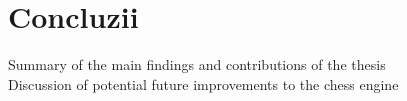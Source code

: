 \chapter{Concluzii}
\label{conclusions}

Summary of the main findings and contributions of the thesis\\
Discussion of potential future improvements to the chess engine
